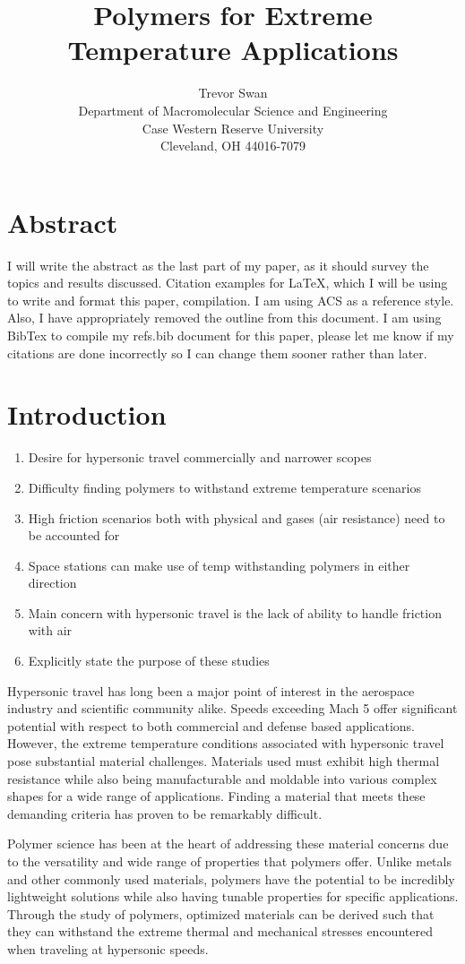 \documentclass[12pt]{article}
\title{Polymers for Extreme Temperature Applications}
\author{Trevor Swan \\
Department of Macromolecular Science and Engineering \\ 
Case Western Reserve University \\
Cleveland, OH 44016-7079}
\date{}
\begin{document}
\maketitle

\section{Abstract}
	I will write the abstract as the last part of my paper, as it should survey the topics and results discussed. Citation examples for LaTeX, which I will be using to write and format this paper, compilation. I am using ACS as a reference style. Also, I have appropriately removed the outline from this document.
\indent I am using BibTex to compile my refs.bib document for this paper, please let me know if my citations are done incorrectly so I can change them sooner rather than later.
\section{Introduction}
	\begin{enumerate}
		\item Desire for hypersonic travel commercially and narrower scopes
		\item Difficulty finding polymers to withstand extreme temperature scenarios
		\item High friction scenarios both with physical and gases (air resistance) need to be accounted for
		\item Space stations can make use of temp withstanding polymers in either direction
		\item Main concern with hypersonic travel is the lack of ability to handle friction with air
		\item Explicitly state the purpose of these studies
	\end{enumerate}
\indent Hypersonic travel has long been a major point of interest in the aerospace industry and scientific community alike. Speeds exceeding Mach 5 offer significant potential with respect to both commercial and defense based applications. However, the extreme temperature conditions associated with hypersonic travel pose substantial material challenges. Materials used must exhibit high thermal resistance while also being manufacturable and moldable into various complex shapes for a wide range of applications. Finding a material that meets these demanding criteria has proven to be remarkably difficult.
	
\indent Polymer science has been at the heart of addressing these material concerns due to the versatility and wide range of properties that polymers offer. Unlike metals and other commonly used materials, polymers have the potential to be incredibly lightweight solutions while also having tunable properties for specific applications. Through the study of polymers, optimized materials can be derived such that they can withstand the extreme thermal and mechanical stresses encountered when traveling at hypersonic speeds. 
\end{document}
